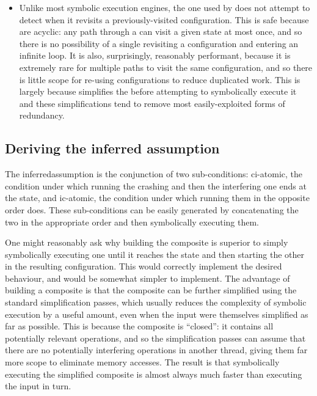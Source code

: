 \begin{itemize}
\item Unlike most symbolic execution engines, the one used by
  {\implementation} does not attempt to detect when it revisits a
  previously-visited configuration.  This is safe because
  {\StateMachines} are acyclic: any path through a {\StateMachine} can
  visit a given state at most once, and so there is no possibility of
  a single revisiting a configuration and entering an infinite loop.
  It is also, surprisingly, reasonably performant, because it is
  extremely rare for multiple paths to visit the same configuration,
  and so there is little scope for re-using configurations to reduce
  duplicated work.  This is largely because {\technique} simplifies
  the {\StateMachine} before attempting to symbolically execute it and
  these simplifications tend to remove most easily-exploited forms of
  redundancy.
\end{itemize}

\subsection{Deriving the inferred assumption}

\label{sect:derive:inferred_assumption}

The \gls{inferredassumption} is the conjunction of two sub-conditions:
\gls{ci-atomic}, the condition under which running the crashing
    {\StateMachine} and then the interfering one ends at the
    {\stSurvive} state, and \gls{ic-atomic}, the condition under which
    running them in the opposite order does.  These sub-conditions can
    be easily generated by concatenating the two {\StateMachines} in
    the appropriate order and then symbolically executing them.

One might reasonably ask why building the composite
{\StateMachine} is superior to simply symbolically executing one
{\StateMachine} until it reaches the {\stSurvive} state and then
starting the other {\StateMachine} in the resulting configuration.
This would correctly implement the desired behaviour, and would be
somewhat simpler to implement.  The advantage of building a composite
{\StateMachine} is that the composite {\StateMachine} can be further
simplified using the standard {\StateMachine} simplification passes,
which usually reduces the complexity of symbolic execution by a useful
amount, even when the input {\StateMachines} were themselves
simplified as far as possible.  This is because the composite
{\StateMachine} is ``closed'': it contains all potentially relevant
operations, and so the simplification passes can assume that there are
no potentially interfering operations in another thread, giving them
far more scope to eliminate memory accesses.  The result is that
symbolically executing the simplified composite {\StateMachine} is
almost always much faster than executing the input {\StateMachines} in
turn.

